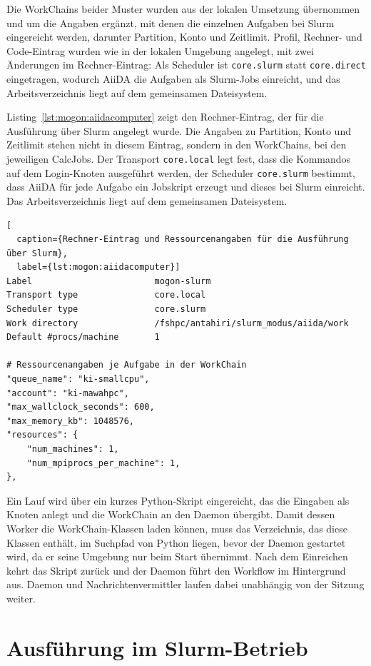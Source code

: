 Die WorkChains beider Muster wurden aus der lokalen Umsetzung
übernommen und um die Angaben ergänzt, mit denen die einzelnen
Aufgaben bei Slurm eingereicht werden, darunter Partition, Konto
und Zeitlimit. Profil, Rechner- und Code-Eintrag wurden wie in der
lokalen Umgebung angelegt, mit zwei Änderungen im Rechner-Eintrag:
Als Scheduler ist \texttt{core.slurm} statt \texttt{core.direct}
eingetragen, wodurch AiiDA die Aufgaben als Slurm-Jobs einreicht,
und das Arbeitsverzeichnis liegt auf dem gemeinsamen Dateisystem.

Listing~\ref{lst:mogon:aiidacomputer} zeigt den Rechner-Eintrag, der
für die Ausführung über Slurm angelegt wurde. Die Angaben zu
Partition, Konto und Zeitlimit stehen nicht in diesem Eintrag,
sondern in den WorkChains, bei den jeweiligen CalcJobs. Der Transport
\texttt{core.local} legt fest, dass die Kommandos auf dem
Login-Knoten ausgeführt werden, der Scheduler \texttt{core.slurm}
bestimmt, dass AiiDA für jede Aufgabe ein Jobskript erzeugt und
dieses bei Slurm einreicht. Das Arbeitsverzeichnis liegt auf dem
gemeinsamen Dateisystem. 

\begin{lstlisting}[
  caption={Rechner-Eintrag und Ressourcenangaben für die Ausführung über Slurm},
  label={lst:mogon:aiidacomputer}]
Label                        mogon-slurm
Transport type               core.local
Scheduler type               core.slurm
Work directory               /fshpc/antahiri/slurm_modus/aiida/work
Default #procs/machine       1

# Ressourcenangaben je Aufgabe in der WorkChain
"queue_name": "ki-smallcpu",
"account": "ki-mawahpc",
"max_wallclock_seconds": 600,
"max_memory_kb": 1048576,
"resources": {
    "num_machines": 1,
    "num_mpiprocs_per_machine": 1,
},
\end{lstlisting}

Ein Lauf wird über ein kurzes Python-Skript eingereicht, das die
Eingaben als Knoten anlegt und die WorkChain an den Daemon
übergibt. Damit dessen Worker die WorkChain-Klassen laden können, muss das Verzeichnis, das diese Klassen enthält, im Suchpfad von Python liegen, bevor der Daemon gestartet wird, da er seine Umgebung nur beim Start übernimmt. Nach dem Einreichen kehrt das Skript zurück und der
Daemon führt den Workflow im Hintergrund aus. Daemon und
Nachrichtenvermittler laufen dabei unabhängig von der Sitzung
weiter.


\section{Ausführung im Slurm-Betrieb}
\label{sec:mogon:slurmbetrieb}


